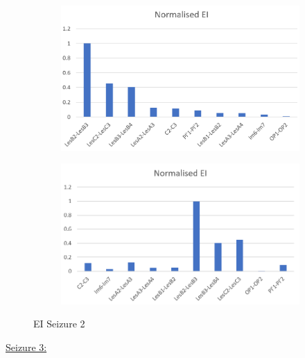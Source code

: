 \documentclass[11pt,oneside]{amsart}
\begin{document}
 \begin{figure}[H]
          \centering
          \begin{subfigure}[H]{0.45\textwidth}
            \centering
              \includegraphics[width=\textwidth]{figures/EI_ord_S2.PNG}
              \label{fig:EI_ordS2}
             \end{subfigure}
             \begin{subfigure}[H]{0.45\textwidth}
              \centering
              \includegraphics[width=\textwidth]{figures/EI_ch_S2.PNG}
              \label{fig:EI_chS2}
          \end{subfigure}
          \caption{EI Seizure 2}
          \label{fig:11}
        \end{figure}
        
\underline{Seizure 3:}
        
\end{document}
